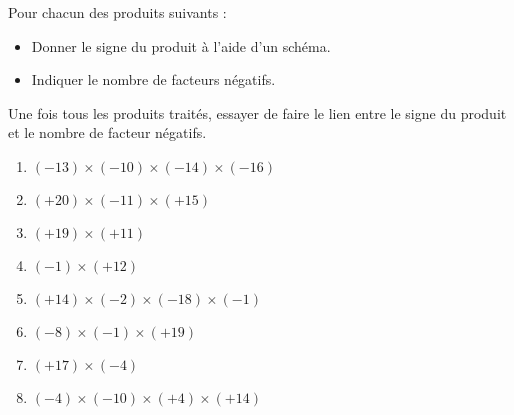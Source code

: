 \begin{exercice*}
    Pour chacun des produits suivants :
    \begin{itemize}
        \item Donner le signe du produit à l'aide d'un schéma.
        \item Indiquer le nombre de facteurs négatifs.
    \end{itemize}
    Une fois tous les produits traités, essayer de faire le lien entre le signe du produit et le nombre de facteur négatifs.
    \begin{enumerate}
            \item $ (-13) \times (-10) \times (-14) \times (-16) $
            \item $ (+20) \times (-11) \times (+15) $
            \item $ (+19) \times (+11) $
            \item $ (-1) \times (+12) $
            \item $ (+14) \times (-2) \times (-18) \times (-1) $
            \item $ (-8) \times (-1) \times (+19) $
            \item $ (+17) \times (-4) $
            \item $ (-4) \times (-10) \times (+4) \times (+14) $
        \end{enumerate}
    
\end{exercice*}
